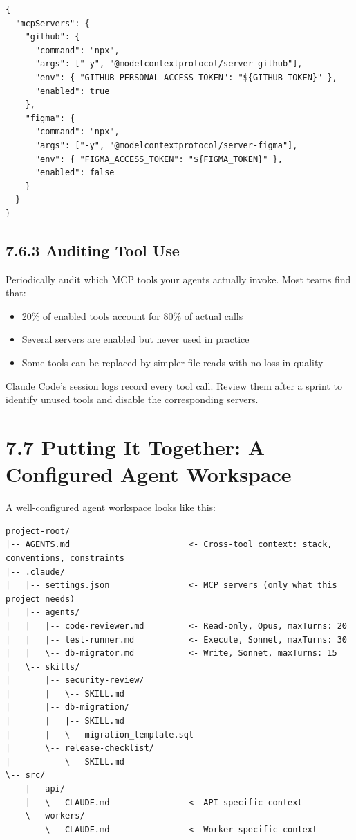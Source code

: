 \documentclass[11pt,a4paper]{book}
\begin{document}
\begin{lstlisting}
{
  "mcpServers": {
    "github": {
      "command": "npx",
      "args": ["-y", "@modelcontextprotocol/server-github"],
      "env": { "GITHUB_PERSONAL_ACCESS_TOKEN": "${GITHUB_TOKEN}" },
      "enabled": true
    },
    "figma": {
      "command": "npx",
      "args": ["-y", "@modelcontextprotocol/server-figma"],
      "env": { "FIGMA_ACCESS_TOKEN": "${FIGMA_TOKEN}" },
      "enabled": false
    }
  }
}
\end{lstlisting}

\subsection{7.6.3 Auditing Tool Use}

Periodically audit which MCP tools your agents actually invoke. Most teams find that:

\begin{itemize}
  \item 20\% of enabled tools account for 80\% of actual calls
  \item Several servers are enabled but never used in practice
  \item Some tools can be replaced by simpler file reads with no loss in quality
\end{itemize}

Claude Code's session logs record every tool call. Review them after a sprint to identify unused tools and disable the corresponding servers.

\medskip

\section{7.7 Putting It Together: A Configured Agent Workspace}

A well-configured agent workspace looks like this:

\begin{lstlisting}
project-root/
|-- AGENTS.md                        <- Cross-tool context: stack, conventions, constraints
|-- .claude/
|   |-- settings.json                <- MCP servers (only what this project needs)
|   |-- agents/
|   |   |-- code-reviewer.md         <- Read-only, Opus, maxTurns: 20
|   |   |-- test-runner.md           <- Execute, Sonnet, maxTurns: 30
|   |   \-- db-migrator.md           <- Write, Sonnet, maxTurns: 15
|   \-- skills/
|       |-- security-review/
|       |   \-- SKILL.md
|       |-- db-migration/
|       |   |-- SKILL.md
|       |   \-- migration_template.sql
|       \-- release-checklist/
|           \-- SKILL.md
\-- src/
    |-- api/
    |   \-- CLAUDE.md                <- API-specific context
    \-- workers/
        \-- CLAUDE.md                <- Worker-specific context
\end{lstlisting}
\end{document}
